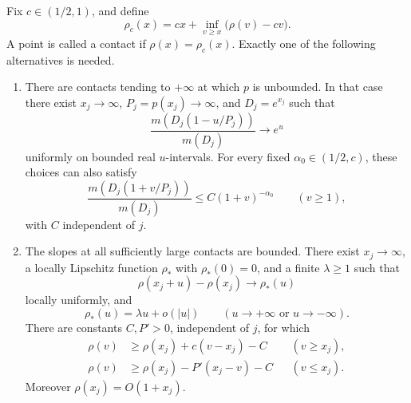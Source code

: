 \begin{lemma}
\label{lem:contact-dichotomy}
Fix \(c\in(1/2,1)\), and define
\begin{equation}
\label{model:contact-envelope}
 \rho_c(x)=cx+\inf_{v\ge x}\bigl(\rho(v)-cv\bigr).
\end{equation}
A point is called a contact if \(\rho(x)=\rho_c(x)\).
Exactly one of the following alternatives is needed.

\begin{enumerate}[label=\textup{(\roman*)}]
\item There are contacts tending to \(+\infty\) at which \(p\) is
unbounded.  In that case there exist \(x_j\to\infty\), \(P_j=p(x_j)\to
\infty\), and \(D_j=e^{x_j}\) such that
\begin{equation}
\label{model:exponential-moment-tangent}
 \frac{m(D_j(1-u/P_j))}{m(D_j)}\longrightarrow e^u
\end{equation}
uniformly on bounded real \(u\)-intervals.  For every fixed
\(\alpha_0\in(1/2,c)\), these choices can also satisfy
\begin{equation}
\label{model:contact-power-tail}
 \frac{m(D_j(1+v/P_j))}{m(D_j)}
 \le C(1+v)^{-\alpha_0}\qquad(v\ge1),
\end{equation}
with \(C\) independent of \(j\).

\item The slopes at all sufficiently large contacts are bounded.
There exist \(x_j\to\infty\), a locally Lipschitz function
\(\rho_*\) with \(\rho_*(0)=0\), and a finite \(\lambda\ge1\) such that
\begin{equation}
\label{model:rho-translate-limit}
 \rho(x_j+u)-\rho(x_j)\longrightarrow\rho_*(u)
\end{equation}
locally uniformly, and
\begin{equation}
\label{model:rho-two-ended-slope}
 \rho_*(u)=\lambda u+o(|u|)\qquad(u\to+\infty\text{ or }u\to-\infty).
\end{equation}
There are constants \(C,P'>0\), independent of \(j\), for which
\begin{align}
\label{model:rho-coarse-envelope}
 \rho(v)&\ge \rho(x_j)+c(v-x_j)-C&& (v\ge x_j),\\
\label{model:rho-fine-envelope}
 \rho(v)&\ge \rho(x_j)-P'(x_j-v)-C&& (v\le x_j).
\end{align}
Moreover \(\rho(x_j)=O(1+x_j)\).
\end{enumerate}
\end{lemma}


